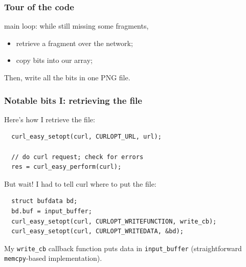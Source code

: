 \documentclass[aspectratio=43]{beamer}
\newenvironment{changemargin}[1]{%
  \begin{list}{}{%
    \setlength{\topsep}{0pt}%
    \setlength{\leftmargin}{#1}%
    \setlength{\rightmargin}{1em}
    \setlength{\listparindent}{\parindent}%
    \setlength{\itemindent}{\parindent}%
    \setlength{\parsep}{\parskip}%
  }%
  \item[]}{\end{list}}
\begin{document}
\begin{frame}
  \frametitle{Tour of the code}

  \begin{changemargin}{2em}
    main loop: while still missing some fragments,
    \begin{itemize}
      \item retrieve a fragment over the network;
      \item copy bits into our array;
    \end{itemize}
    Then, write all the bits in one PNG file.
  \end{changemargin}

\end{frame}

\begin{frame}[fragile]
  \frametitle{Notable bits I: retrieving the file}

  \begin{changemargin}{2em}

    Here's how I retrieve the file:

    \begin{lstlisting}
  curl_easy_setopt(curl, CURLOPT_URL, url);

  // do curl request; check for errors
  res = curl_easy_perform(curl);
    \end{lstlisting}

    But wait! I had to tell curl where to put the file:

    \begin{lstlisting}
  struct bufdata bd; 
  bd.buf = input_buffer; 
  curl_easy_setopt(curl, CURLOPT_WRITEFUNCTION, write_cb);
  curl_easy_setopt(curl, CURLOPT_WRITEDATA, &bd);
    \end{lstlisting}

    My {\tt write\_cb} callback function puts data in {\tt input\_buffer} (straightforward {\tt memcpy}-based
    implementation).

  \end{changemargin}
\end{frame}
\end{document}
